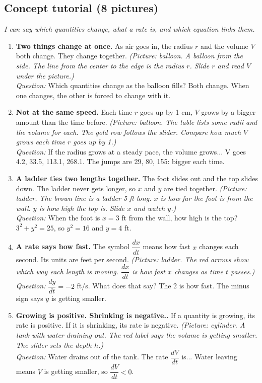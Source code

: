 \documentclass[11pt]{article}
\begin{document}
\subsection*{Concept tutorial (8 pictures)}
\textit{I can say which quantities change, what a rate is, and which equation links them.}\par
\begin{enumerate}
\item \textbf{Two things change at once.} As air goes in, the radius $r$ and the volume $V$ both change. They change together. \textit{(Picture: balloon. A balloon from the side. The line from the center to the edge is the radius $r$. Slide $r$ and read $V$ under the picture.)}\\ \textit{Question:} Which quantities change as the balloon fills?  Both change. When one changes, the other is forced to change with it.
\item \textbf{Not at the same speed.} Each time $r$ goes up by 1 cm, $V$ grows by a bigger amount than the time before. \textit{(Picture: balloon. The table lists some radii and the volume for each. The gold row follows the slider. Compare how much $V$ grows each time $r$ goes up by 1.)}\\ \textit{Question:} If the radius grows at a steady pace, the volume grows...  V goes 4.2, 33.5, 113.1, 268.1. The jumps are 29, 80, 155: bigger each time.
\item \textbf{A ladder ties two lengths together.} The foot slides out and the top slides down. The ladder never gets longer, so $x$ and $y$ are tied together. \textit{(Picture: ladder. The brown line is a ladder 5 ft long. $x$ is how far the foot is from the wall. $y$ is how high the top is. Slide $x$ and watch $y$.)}\\ \textit{Question:} When the foot is $x=3$ ft from the wall, how high is the top?  $3^2+y^2=25$, so $y^2=16$ and $y=4$ ft.
\item \textbf{A rate says how fast.} The symbol $\dfrac{dx}{dt}$ means how fast $x$ changes each second. Its units are feet per second. \textit{(Picture: ladder. The red arrows show which way each length is moving. $\dfrac{dx}{dt}$ is how fast $x$ changes as time $t$ passes.)}\\ \textit{Question:} $\dfrac{dy}{dt}=-2$ ft/s. What does that say?  The 2 is how fast. The minus sign says $y$ is getting smaller.
\item \textbf{Growing is positive. Shrinking is negative..} If a quantity is growing, its rate is positive. If it is shrinking, its rate is negative. \textit{(Picture: cylinder. A tank with water draining out. The red label says the volume is getting smaller. The slider sets the depth $h$.)}\\ \textit{Question:} Water drains out of the tank. The rate $\dfrac{dV}{dt}$ is...  Water leaving means $V$ is getting smaller, so $\dfrac{dV}{dt}<0$.

\end{enumerate}
\end{document}
